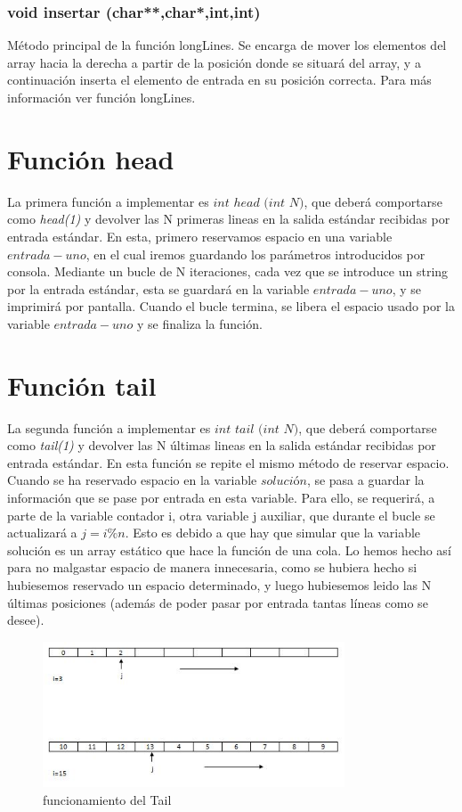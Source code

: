 \subsubsection{void insertar (char**,char*,int,int)}
Método principal de la función longLines. Se encarga de mover los elementos del array hacia la derecha a partir de la posición donde se situará  del array, y a continuación inserta el elemento de entrada en su posición correcta. Para más información ver función longLines. 
\section{Función head}
La primera función a implementar es $int$ $head$ $(int$ $N)$, que deberá comportarse como \textit{head(1)} y devolver las N primeras lineas en la salida estándar recibidas por entrada estándar.
En esta, primero reservamos espacio en una variable $entrada-uno$, en el cual iremos guardando los parámetros introducidos por consola. Mediante un bucle de N iteraciones, cada vez que se introduce un string por la entrada estándar, esta se guardará en la variable $entrada-uno$, y se imprimirá por pantalla.
Cuando el bucle termina, se libera el espacio usado por la variable $entrada-uno$ y se finaliza la función.
\section{Función tail}
La segunda función a implementar es $int$ $tail$ $(int$ $N)$, que deberá comportarse como \textit{tail(1)} y devolver las N últimas lineas en la salida estándar recibidas por entrada estándar.
En esta función se repite el mismo método de reservar espacio. Cuando se ha reservado espacio en la variable $solución$, se pasa a guardar la información que se pase por entrada en esta variable. Para ello, se requerirá, a parte de la variable contador i, otra variable j auxiliar, que durante el bucle se actualizará a $j=i\%n$. Esto es debido a que hay que simular que la variable solución es un array estático que hace la función de una cola. Lo hemos hecho así para no malgastar espacio de manera innecesaria, como se hubiera hecho si hubiesemos reservado un espacio determinado, y luego hubiesemos leido las N últimas posiciones (además de poder pasar por entrada tantas líneas como se desee).
\begin{figure}[htb]
\begin{center}
\centering
  \includegraphics[width=0.8\textwidth]{./img_1}
  \caption{funcionamiento del Tail}
  \label{fig:Funcionamiento del Tail}
\end{center}
\end{figure} 

